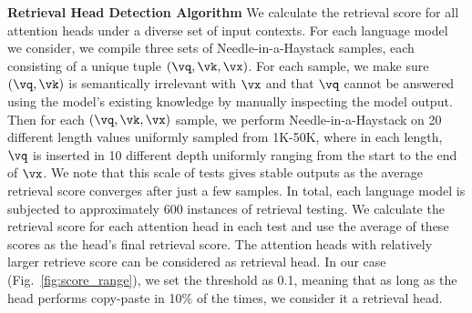 \textbf{Retrieval Head Detection Algorithm}\quad\quad
We calculate the retrieval score for all attention heads under a diverse set of input contexts. 
For each language model we consider, we compile three sets of Needle-in-a-Haystack samples, each consisting of a unique tuple $(\vq, \vk, \vx)$.
For each sample, we make sure $(\vq, \vk)$ is semantically irrelevant with $\vx$ and that $\vq$ cannot be answered using the model's existing knowledge by manually inspecting the model output. 
Then for each $(\vq, \vk, \vx)$ sample, we perform  Needle-in-a-Haystack on 20 different length values uniformly sampled from 1K-50K, where in each length, $\vq$ is inserted in 10 different depth uniformly ranging from the start to the end of $\vx$.
We note that this scale of tests gives stable outputs as the average retrieval score converges after just a few samples. 
In total, each language model is subjected to approximately 600 instances of retrieval testing. 
We calculate the retrieval score for each attention head in each test and use the average of these scores as the head's final retrieval score.
The attention heads with relatively larger retrieve score  can be considered as retrieval head.
In our case (Fig.~\ref{fig:score_range}), we set the threshold as 0.1, meaning that as long as the head performs copy-paste in 10\% of the times, we consider it a retrieval head. 
